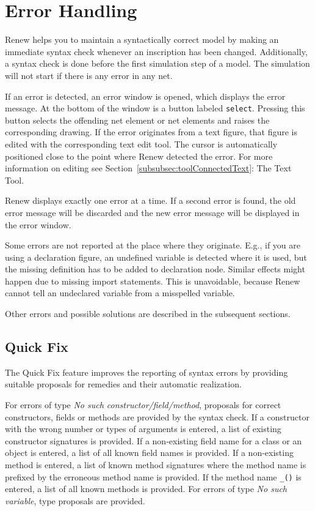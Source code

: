 \section{Error Handling}
\label{sec:errors}

Renew helps you to maintain a syntactically correct model
by making an immediate syntax check whenever an inscription
has been changed. Additionally, a syntax check is done
before the first simulation step of a model.
The simulation will not start if there is any error in any net.

If an error is detected, an error window is opened,
which displays the error message. At the bottom of the window
is a button labeled \texttt{select}. Pressing this button
selects the offending net element or net elements and
raises the corresponding drawing. If the error originates
from a text figure, that figure is edited with the corresponding text edit
tool. The cursor is automatically positioned close to the
point where Renew detected the error. For more information on editing see
Section~\ref{subsubsec:toolConnectedText}: The Text Tool.

Renew displays exactly one error at a time. If a second error is
found, the old error message will be discarded and the
new error message will be displayed in the error window.

Some errors are not reported at the place where they
originate. E.g., if you are using a declaration figure,
an undefined variable is detected where
it is used, but the missing definition has to be
added to declaration node. Similar effects might happen
due to missing import statements. This is unavoidable, because
Renew cannot tell an undeclared variable from a misspelled
variable.

Other errors and possible solutions are described in the subsequent sections.

\subsection{Quick Fix}

The Quick Fix feature improves the reporting of syntax errors by providing suitable proposals for remedies and their automatic realization.

For errors of type \emph{No such constructor/field/method},
proposals for correct constructors, fields or methods are provided by
the syntax check. If a constructor with the wrong number or types of
arguments is entered, a list of existing constructor signatures is
provided. If a non-existing field name for a class or an object is
entered, a list of all known field names is provided. If a
non-existing method is entered, a list of known method signatures
where the method name is prefixed by the erroneous method name is
provided. If the method name \texttt{\_()} is entered, a list of all
known methods is provided. 
For errors of type \emph{No such variable}, type proposals are provided.

